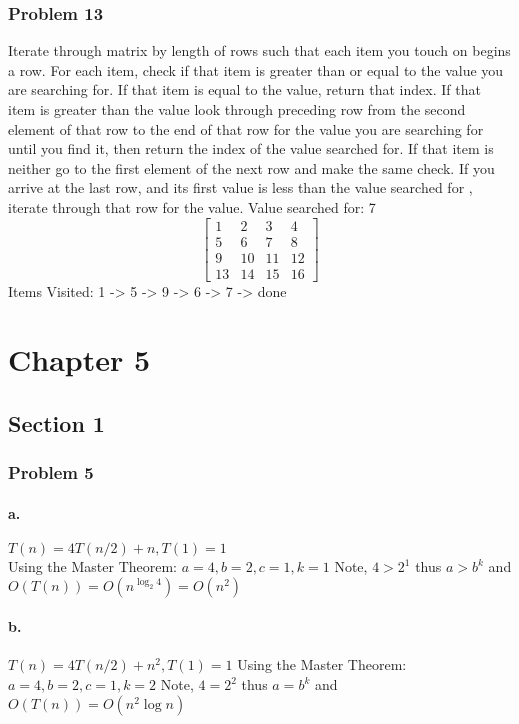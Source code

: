 \documentclass{article}
\newcommand\ttab[0]{\tabto{5mm}}
\newcommand\tttab[0]{\tabto{1cm}}
\begin{document}
        \subsubsection{Problem 13}
        Iterate through matrix by length of rows such that each item you touch on
        begins a row. For each item, check if that item is greater than or equal to the value you are
        searching for. If that item is equal to the value, return that index. If that item is greater than the value look through preceding row from the
        second element of that row to the end of that row for the value you are searching for until you find it,
        then return the index of the value searched for.
        If that item is neither go to the first element of the next row and make the same check.
        If you arrive at the last row, and its first value is less than the value searched for
        , iterate through that row for the value.
        \newline
        Value searched for: 7
        \[
        \begin{bmatrix}
        1 & 2 & 3 & 4 \\
        5 & 6 & 7 & 8 \\
        9 & 10 & 11 & 12 \\
        13 & 14 & 15 & 16
        \end{bmatrix}
        \]
        Items Visited: 1 -> 5 -> 9 -> 6 -> 7 -> done

    \section{Chapter 5}
      \subsection{Section 1}
        \subsubsection{Problem 5}
          \paragraph{a.}
            $T(n) = 4T(n/2) + n, T(1)=1$\\
            \ttab Using the Master Theorem:
            \tttab $a=4, b=2, c=1, k=1$
            \tttab Note, $ 4>2^1$ thus $a>b^k$ and $O(T(n)) = O(n^{\log_2{4}}) = O(n^2)$
          \paragraph{b.}
            $T(n) = 4T(n/2)+n^2, T(1)=1$
            \ttab Using the Master Theorem:
            \tttab $a=4, b=2, c=1, k=2$
            \tttab Note, $4=2^2$ thus $a=b^k$ and $O(T(n)) = O(n^2\log{n})$
\end{document}
